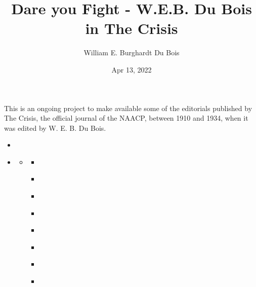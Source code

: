 \documentclass[letterpaper,10pt,english]{jupyterBook}
\title{Dare you Fight - W.E.B. Du Bois in The Crisis}
\date{Apr 13, 2022}
\author{William E.\@{} Burghardt Du Bois}
\begin{document}
\pagestyle{empty}
\sphinxmaketitle
\pagestyle{plain}
\sphinxtableofcontents
\pagestyle{normal}
\label{\detokenize{index::doc}}


\sphinxAtStartPar
This is an ongoing project to make available some of the editorials published by The Crisis, the official journal of the NAACP, between 1910 and 1934, when it was edited by W. E. B. Du Bois.
\begin{itemize}
\item {} 
\sphinxAtStartPar
{\hyperref[\detokenize{introduction::doc}]{}}

\item {} 
\sphinxAtStartPar
{\hyperref[\detokenize{Sections/socialchange::doc}]{}}
\begin{itemize}
\item {} 
\sphinxAtStartPar
{\hyperref[\detokenize{Sections/protest::doc}]{}}
\begin{itemize}
\item {} 
\sphinxAtStartPar
{\hyperref[\detokenize{Volumes/01/01/Agitation::doc}]{}}

\item {} 
\sphinxAtStartPar
{\hyperref[\detokenize{Volumes/05/05/proper_way::doc}]{}}

\item {} 
\sphinxAtStartPar
{\hyperref[\detokenize{Volumes/16/03/close_ranks::doc}]{}}

\item {} 
\sphinxAtStartPar
{\hyperref[\detokenize{Volumes/19/01/statement::doc}]{}}

\item {} 
\sphinxAtStartPar
{\hyperref[\detokenize{Volumes/12/06/negro_party::doc}]{}}

\item {} 
\sphinxAtStartPar
{\hyperref[\detokenize{Volumes/22/01/inter-racial_comity::doc}]{}}

\item {} 
\sphinxAtStartPar
{\hyperref[\detokenize{Volumes/24/01/publicity::doc}]{}}

\item {} 
\sphinxAtStartPar
{\hyperref[\detokenize{Volumes/41/05/violence::doc}]{}}


\end{itemize}
\end{itemize}
\end{itemize}
\end{document}
